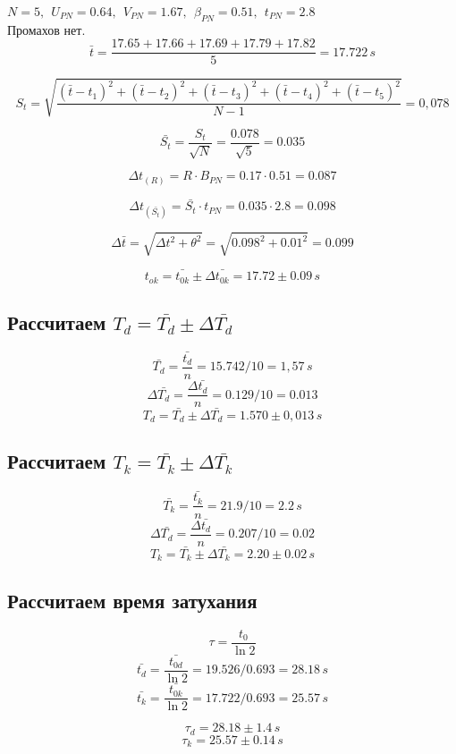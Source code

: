 \documentclass[a4paper,12pt]{report}
\begin{document}
$N=5,\ \ U_{PN}=0.64,\ \ V_{PN}=1.67,\ \ \beta_{PN}=0.51,\ \ t_{PN}=2.8$\\
Промахов нет.\\

\[\bar{t}= \frac{17.65+17.66+17.69+17.79+17.82}{5} =17.722 \, s\]

\[S_{t}=\sqrt{\frac{(\bar{t}-{t}_1)^2+(\bar{t}-{t}_2)^2+(\bar{t}-{t}_3)^2+(\bar{t}-{t}_4)^2+(\bar{t}-{t}_5)^2}{N-1}} = 0,078\]

\[ \bar{S_{t}}=\frac{S_{t}}{\sqrt{N}}=\frac{0.078}{\sqrt{5}}=0.035 \]

\[ \Delta{t}_{(R)}=R\cdot B_{PN}=0.17\cdot 0.51=0.087 \]

\[\Delta{t}_{(\bar{S_{t}})}=\bar{S_t}\cdot t_{PN}=0.035\cdot 2.8=0.098\]

\[ \Delta{\bar{t}}=\sqrt{\Delta t^2 + \theta^2}=\sqrt{0.098^2 + 0.01^2}=0.099 \]

\[{t_{ok}}=\bar{t_{0k}}\pm \Delta{\bar{t_{0k}}}=17.72\pm 0.09 \, s\]

\subsection*{Рассчитаем $T_d = \bar{T_d} \pm \Delta \bar{T_d}$}

\[ \bar{T_d} = \frac{\bar{t_d}}{n} = 15.742/10 = 1,57 \, s \]
\[ \Delta \bar{T_d} = \frac{\Delta \bar{t_d}}{n} = 0.129/10 = 0.013 \]
\[ T_d = \bar{T_d} \pm \Delta \bar{T_d} = 1.570 \pm 0,013 \, s \]

\subsection*{Рассчитаем $T_k = \bar{T_k} \pm \Delta \bar{T_k}$}

\[ \bar{T_k} = \frac{\bar{t_k}}{n} = 21.9/10 = 2.2 \, s \]
\[ \Delta \bar{T_d} = \frac{\Delta \bar{t_d}}{n} = 0.207/10 = 0.02 \]
\[ T_k = \bar{T_k} \pm \Delta \bar{T_k} = 2.20 \pm 0.02 \, s \]

\subsection*{Рассчитаем время затухания}

\[ \tau = \frac{t_0}{\ln2} \]
\[ \bar{t_{d}} = \frac{\bar{t_{0d}}}{\ln2} = 19.526/0.693 = 28.18 \, s \]
\[ \bar{t_{k}} = \frac{\bar{t_{0k}}}{\ln2} = 17.722/0.693 = 25.57 \, s \]

\[ \tau_d = 28.18 \pm 1.4 \, s \]
\[ \tau_k = 25.57 \pm 0.14 \, s \]
\end{document}
